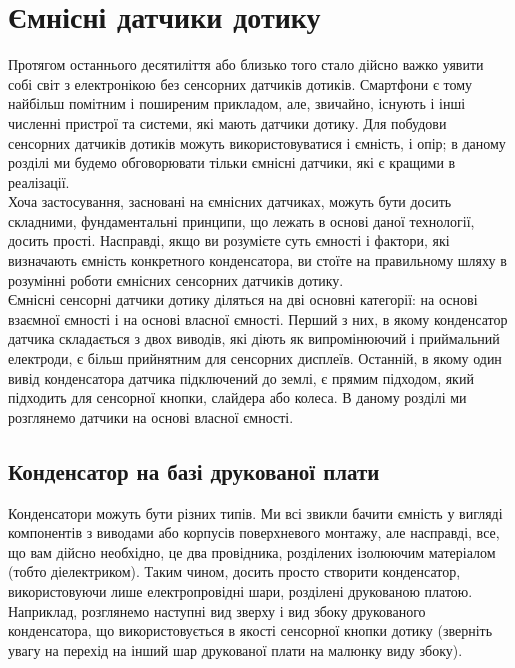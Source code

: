 \documentclass[a4paper,fontsize=12]{report}
\begin{document}
\tableofcontents
\setcounter{page}{2}
\newpage

\chapter{Ємнісні датчики дотику}
  Протягом останнього десятиліття або близько того стало дійсно важко уявити собі світ з електронікою без сенсорних датчиків дотиків. Смартфони є тому найбільш помітним і поширеним прикладом, але, звичайно, існують і інші численні пристрої та системи, які мають датчики дотику. Для побудови сенсорних датчиків дотиків можуть використовуватися і ємність, і опір; в даному розділі ми будемо обговорювати тільки ємнісні датчики, які є кращими в реалізації.\\

  Хоча застосування, засновані на ємнісних датчиках, можуть бути досить складними, фундаментальні принципи, що лежать в основі даної технології, досить прості. Насправді, якщо ви розумієте суть ємності і фактори, які визначають ємність конкретного конденсатора, ви стоїте на правильному шляху в розумінні роботи ємнісних сенсорних датчиків дотику.\\

  Ємнісні сенсорні датчики дотику діляться на дві основні категорії: на основі взаємної ємності і на основі власної ємності. Перший з них, в якому конденсатор датчика складається з двох виводів, які діють як випромінюючий і приймальний електроди, є більш прийнятним для сенсорних дисплеїв. Останній, в якому один вивід конденсатора датчика підключений до землі, є прямим підходом, який підходить для сенсорної кнопки, слайдера або колеса. В даному розділі ми розглянемо датчики на основі власної ємності.\\
\section{Конденсатор на базі друкованої плати}\par

  Конденсатори можуть бути різних типів. Ми всі звикли бачити ємність у вигляді компонентів з виводами або корпусів поверхневого монтажу, але насправді, все, що вам дійсно необхідно, це два провідника, розділених ізолюючим матеріалом (тобто діелектриком). Таким чином, досить просто створити конденсатор, використовуючи лише електропровідні шари, розділені друкованою платою. Наприклад, розглянемо наступні вид зверху і вид збоку друкованого конденсатора, що використовується в якості сенсорної кнопки дотику (зверніть увагу на перехід на інший шар друкованої плати на малюнку виду збоку).
\end{document}
